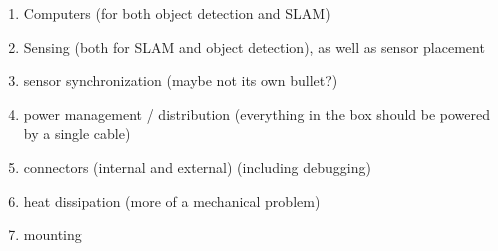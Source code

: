 \begin{enumerate}
	\item Computers (for both object detection and SLAM)
	\item Sensing (both for SLAM and object detection), as well as sensor placement 
	\item sensor synchronization (maybe not its own bullet?)
	\item power management / distribution (everything in the box should be powered by a single cable)
	\item connectors (internal and external) (including debugging)
	\item heat dissipation (more of a mechanical problem)
	\item mounting
\end{enumerate}